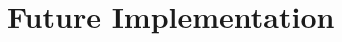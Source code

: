 \documentclass[USenglish]{uit-thesis}
\begin{document}
\section{Future Implementation}
\label{sec:future_implementation}
\end{document}
